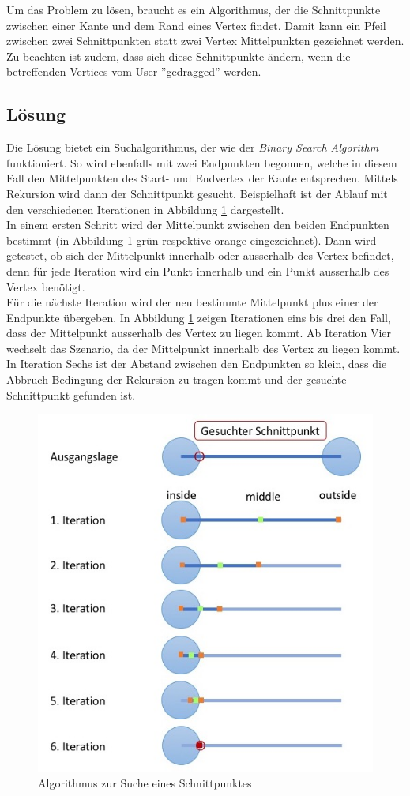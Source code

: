 \documentclass[11pt,a4paper,english,oneside]{book}
\numberwithin{equation}{chapter}
\begin{document}
	Um das Problem zu lösen, braucht es ein Algorithmus, der die Schnittpunkte zwischen einer Kante und dem Rand eines Vertex findet. Damit kann ein Pfeil zwischen zwei Schnittpunkten statt zwei Vertex Mittelpunkten gezeichnet werden. Zu beachten ist zudem, dass sich diese Schnittpunkte ändern, wenn die betreffenden Vertices vom User ''gedragged'' werden.
	
	\subsection{Lösung}
	Die Lösung bietet ein Suchalgorithmus, der wie der \textit{Binary Search Algorithm} \cite{adbook} funktioniert. So wird ebenfalls mit zwei Endpunkten begonnen, welche in diesem Fall den Mittelpunkten des Start- und Endvertex der Kante entsprechen. Mittels Rekursion wird dann der Schnittpunkt gesucht. Beispielhaft ist der Ablauf mit den verschiedenen Iterationen in Abbildung \ref{fig:binarySearch} dargestellt. \\
	In einem ersten Schritt wird der Mittelpunkt zwischen den beiden Endpunkten bestimmt (in Abbildung  \ref{fig:binarySearch} grün respektive orange eingezeichnet). Dann wird getestet, ob sich der Mittelpunkt innerhalb oder ausserhalb des Vertex befindet, denn für jede Iteration wird ein Punkt innerhalb und ein Punkt ausserhalb des Vertex benötigt. \\
	Für die nächste Iteration wird der neu bestimmte Mittelpunkt plus einer der Endpunkte übergeben. In Abbildung  \ref{fig:binarySearch} zeigen Iterationen eins bis drei den Fall, dass der Mittelpunkt ausserhalb des Vertex zu liegen kommt. Ab Iteration Vier wechselt das Szenario, da der Mittelpunkt innerhalb des Vertex zu liegen kommt. In Iteration Sechs ist der Abstand zwischen den Endpunkten so klein, dass die Abbruch Bedingung der Rekursion zu tragen kommt und der gesuchte Schnittpunkt gefunden ist.
	
	\begin{figure}[h!]
		\centering
		\includegraphics[width=0.6\linewidth]{assets/images/binarySearch}
		\caption{Algorithmus zur Suche eines Schnittpunktes}
		\label{fig:binarySearch}
	\end{figure}
	
\end{document}
